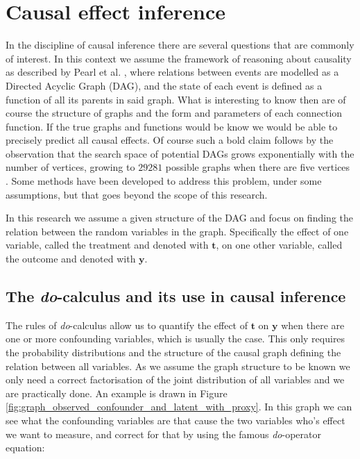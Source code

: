 \documentclass{report}
\newcommand{\bt}{\mathbf{t}}
\newcommand{\by}{\mathbf{y}}
\begin{document}
\chapter{Causal effect inference}
In the discipline of causal inference there are several questions that are commonly of interest. In this context we assume the framework of reasoning about causality as described by Pearl et al. \cite{pearl2009causal}, where relations between events are modelled as a Directed Acyclic Graph (DAG), and the state of each event is defined as a function of all its parents in said graph. What is interesting to know then are of course the structure of graphs and the form and parameters of each connection function. If the true graphs and functions would be know we would be able to precisely predict all causal effects. Of course such a bold claim follows by the observation that the search space of potential DAGs grows exponentially with the number of vertices, growing to $29281$ possible graphs when there are five vertices \cite{robinson1977counting}. Some methods have been developed to address this problem, under some assumptions, but that goes beyond the scope of this research.

In this research we assume a given structure of the DAG and focus on finding the relation between the random variables in the graph. Specifically the effect of one variable, called the treatment and denoted with $\bt$, on one other variable, called the outcome and denoted with $\by$. 

\section{The \textit{do}-calculus and its use in causal inference}
The rules of \textit{do}-calculus allow us to quantify the effect of $\bt$ on $\by$ when there are one or more confounding variables, which is usually the case. This only requires the probability distributions and the structure of the causal graph defining the relation between all variables. As we assume the graph structure to be known we only need a correct factorisation of the joint distribution of all variables and we are practically done. An example is drawn in Figure \ref{fig:graph_observed_confounder_and_latent_with_proxy}. In this graph we can see what the confounding variables are that cause the two variables who's effect we want to measure, and correct for that by using the famous \textit{do}-operator equation:
\end{document}
